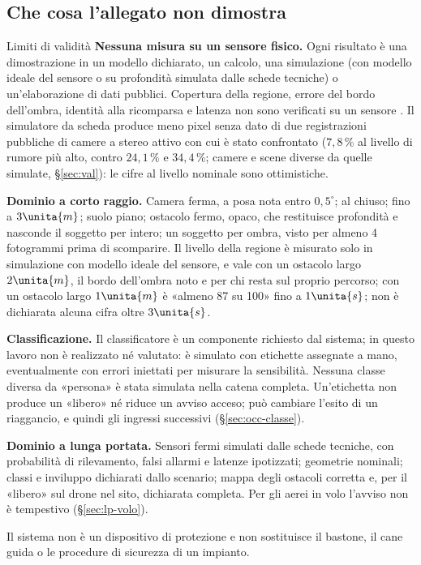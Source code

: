 \subsection{Che cosa l'allegato non dimostra}\label{sec:intro-limiti}

\begin{riquadro}{Limiti di validità}
\textbf{Nessuna misura su un sensore fisico.} Ogni risultato è una dimostrazione in un modello dichiarato, un calcolo, una simulazione (con modello ideale del sensore o su profondità simulata dalle schede tecniche) o un'elaborazione di dati pubblici. Copertura della regione, errore del bordo dell'ombra, identità alla ricomparsa e latenza non sono verificati su un sensore . Il simulatore da scheda produce meno pixel senza dato di due registrazioni pubbliche di camere a stereo attivo con cui è stato confrontato ($7{,}8\,\%$ al livello di rumore più alto, contro $24{,}1\,\%$ e $34{,}4\,\%$; camere e scene diverse da quelle simulate, \S\ref{sec:val}): le cifre al livello nominale sono ottimistiche.

\textbf{Dominio a corto raggio.} Camera ferma, a posa nota entro $0{,}5^\circ$; al chiuso; fino a $3\unita{m}$; suolo piano; ostacolo fermo, opaco, che restituisce profondità e nasconde il soggetto per intero; un soggetto per ombra, visto per almeno 4 fotogrammi prima di scomparire. Il livello della regione è misurato solo in simulazione con modello ideale del sensore, e vale con un ostacolo largo $2\unita{m}$, il bordo dell'ombra noto e per chi resta sul proprio percorso; con un ostacolo largo $1\unita{m}$ è «almeno 87 su 100» fino a $1\unita{s}$; non è dichiarata alcuna cifra oltre $3\unita{s}$.

\textbf{Classificazione.} Il classificatore è un componente richiesto dal sistema; in questo lavoro non è realizzato né valutato: è simulato con etichette assegnate a mano, eventualmente con errori iniettati per misurare la sensibilità. Nessuna classe diversa da «persona» è stata simulata nella catena completa. Un'etichetta non produce un «libero» né riduce un avviso acceso; può cambiare l'esito di un riaggancio, e quindi gli ingressi successivi (\S\ref{sec:occ-classe}).

\textbf{Dominio a lunga portata.} Sensori fermi simulati dalle schede tecniche, con probabilità di rilevamento, falsi allarmi e latenze ipotizzati; geometrie nominali; classi e inviluppo dichiarati dallo scenario; mappa degli ostacoli corretta e, per il «libero» sul drone nel sito, dichiarata completa. Per gli aerei in volo l'avviso non è tempestivo (\S\ref{sec:lp-volo}).

Il sistema non è un dispositivo di protezione e non sostituisce il bastone, il cane guida o le procedure di sicurezza di un impianto.
\end{riquadro}

